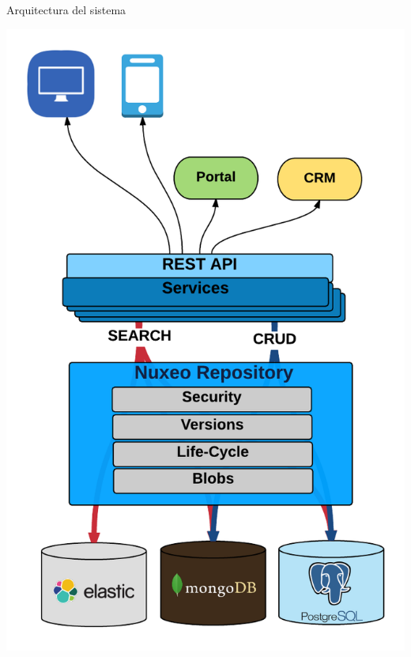 \documentclass{beamer}
\begin{document}
\begin{frame}{Arquitectura del sistema}
\begin{figure}[h]
		\end{figure}
		\includegraphics[scale=0.1]{images_latex/api}
	
	\end{frame}
\end{document}
